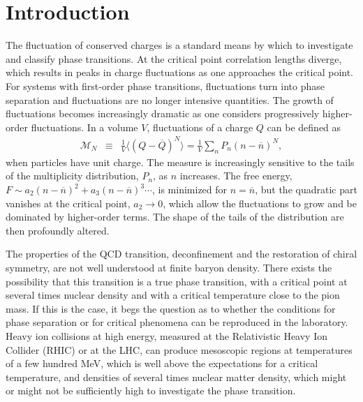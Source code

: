 
\section{Introduction}\label{sec:intro}

The fluctuation of conserved charges is a standard means by which to investigate and classify phase transitions. At the critical point correlation lengths diverge, which results in peaks in charge fluctuations as one approaches the critical point. For systems with first-order phase transitions, fluctuations turn into phase separation and fluctuations are no longer intensive quantities. The growth of fluctuations becomes increasingly dramatic as one considers progressively higher-order fluctuations. In a volume $V$, fluctuations of a charge $Q$ can be defined as
\begin{eqnarray}\label{eq:kappadef}
\mathcal{M}_N&\equiv&\frac{1}{V}\langle(Q-\overline{Q})^N\rangle=\frac{1}{V}\sum_n P_n(n-\overline{n})^N,
\end{eqnarray}
when particles have unit charge. The measure is increasingly sensitive to the tails of the multiplicity distribution, $P_n$, as $n$ increases. The free energy, $F\sim a_2(n-\overline{n})^2 + a_3(n-\overline{n})^3\cdots$, is minimized for $n=\overline{n}$, but the quadratic part vanishes at the critical point, $a_2\rightarrow 0$, which allow the fluctuations to grow and be dominated by higher-order terms. The shape of the tails of the distribution are then profoundly altered. 

The properties of the QCD  transition, deconfinement and the restoration of chiral symmetry, are not well understood at finite baryon density. There exists the possibility that this transition is a true phase transition, with a critical point at several times nuclear density and with a critical temperature close to the pion mass. If this is the case, it begs the question as to whether the conditions for phase separation or for critical phenomena can be reproduced in the laboratory. Heavy ion collisions at high energy, measured at the Relativistic Heavy Ion Collider (RHIC) or at the LHC, can produce mesoscopic regions at temperatures of a few hundred MeV, which is well above the expectations for a critical temperature, and densities of several times nuclear matter density, which might or might not be sufficiently high to investigate the phase transition. 

